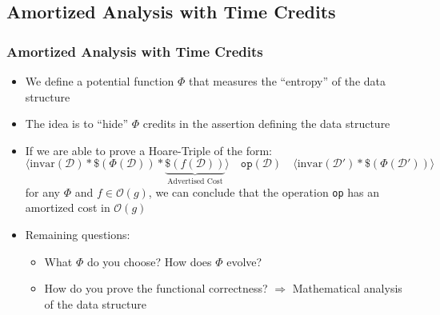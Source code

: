 \subsection{Amortized Analysis with Time Credits}
\begin{frame}
	\frametitle{Amortized Analysis with Time Credits}
	\begin{itemize}
		\item We define a potential function $\Phi$ that measures the ``entropy'' of the data structure
		\item The idea is to ``hide'' $\Phi$ credits in the assertion defining the data structure
		\item If we are able to prove a Hoare-Triple of the form:
		\begin{equation*}
		\langle \mathrm{invar}(\mathcal{D}) * \$(\Phi(\mathcal{D})) * \underbrace{\$(f(\mathcal{D}))}_{\text{Advertised Cost}} \rangle 
		\quad \mathtt{op}(\mathcal{D}) \quad 
		\langle \mathrm{invar}(\mathcal{D'}) * \$(\Phi(\mathcal{D}')) \rangle
		\end{equation*}
		for any $\Phi$ and $f \in \mathcal{O}(g)$, we can conclude that the operation \texttt{op} has an amortized cost in $\mathcal{O}(g)$
		\item Remaining questions: \begin{itemize}
			\item What $\Phi$ do you choose? How does $\Phi$ evolve?
			\item How do you prove the functional correctness? \newline
			$\Longrightarrow$ Mathematical analysis of the data structure
		\end{itemize}
	\end{itemize}
\end{frame}



